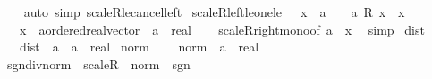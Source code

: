 \begin{isabellebody}
%
\isadelimproof
\ \ %
\endisadelimproof
%
\isatagproof
{}\isamarkupfalse%
\ {\isacharparenleft}{\kern0pt}auto\ simp{\isacharcolon}{\kern0pt}\ scaleR{\isacharunderscore}{\kern0pt}le{\isacharunderscore}{\kern0pt}cancel{\isacharunderscore}{\kern0pt}left{\isacharparenright}{\kern0pt}%
\endisatagproof
{\isafoldproof}%
%
\isadelimproof
\isanewline
%
\endisadelimproof
\isanewline
{}\isamarkupfalse%
\ scaleR{\isacharunderscore}{\kern0pt}left{\isacharunderscore}{\kern0pt}le{\isacharunderscore}{\kern0pt}one{\isacharunderscore}{\kern0pt}le{\isacharcolon}{\kern0pt}\ {\isachardoublequoteopen}{}\ {\isasymle}\ x\ {\isasymLongrightarrow}\ a\ {\isasymle}\ {}\ {\isasymLongrightarrow}\ a\ {\isacharasterisk}{\kern0pt}\isactrlsub R\ x\ {\isasymle}\ x{\isachardoublequoteclose}\isanewline
\ \ \ x\ {\isacharcolon}{\kern0pt}{\isacharcolon}{\kern0pt}\ {\isachardoublequoteopen}{\isacharprime}{\kern0pt}a{\isacharcolon}{\kern0pt}{\isacharcolon}{\kern0pt}ordered{\isacharunderscore}{\kern0pt}real{\isacharunderscore}{\kern0pt}vector{\isachardoublequoteclose}\ \ a\ {\isacharcolon}{\kern0pt}{\isacharcolon}{\kern0pt}\ real\isanewline
%
\isadelimproof
\ \ %
\endisadelimproof
%
\isatagproof
{}\isamarkupfalse%
\ scaleR{\isacharunderscore}{\kern0pt}right{\isacharunderscore}{\kern0pt}mono{\isacharbrackleft}{\kern0pt}of\ a\ {}\ x{\isacharbrackright}{\kern0pt}\ \isamarkupfalse%
\ simp%
\endisatagproof
{\isafoldproof}%
%
\isadelimproof
%
\endisadelimproof
%
\isadelimdocument
%
\endisadelimdocument
%
\isatagdocument
%
\isamarkuptrue%
%
\endisatagdocument
{\isafolddocument}%
%
\isadelimdocument
%
\endisadelimdocument
{}\isamarkupfalse%
\ dist\ {\isacharequal}{\kern0pt}\isanewline
\ \ \ dist\ {\isacharcolon}{\kern0pt}{\isacharcolon}{\kern0pt}\ {\isachardoublequoteopen}{\isacharprime}{\kern0pt}a\ {\isasymRightarrow}\ {\isacharprime}{\kern0pt}a\ {\isasymRightarrow}\ real{\isachardoublequoteclose}\isanewline
\isanewline
{}\isamarkupfalse%
\ norm\ {\isacharequal}{\kern0pt}\isanewline
\ \ \ norm\ {\isacharcolon}{\kern0pt}{\isacharcolon}{\kern0pt}\ {\isachardoublequoteopen}{\isacharprime}{\kern0pt}a\ {\isasymRightarrow}\ real{\isachardoublequoteclose}\isanewline
\isanewline
{}\isamarkupfalse%
\ sgn{\isacharunderscore}{\kern0pt}div{\isacharunderscore}{\kern0pt}norm\ {\isacharequal}{\kern0pt}\ scaleR\ {\isacharplus}{\kern0pt}\ norm\ {\isacharplus}{\kern0pt}\ sgn\ {\isacharplus}{\kern0pt}\isanewline

\end{isabellebody}
